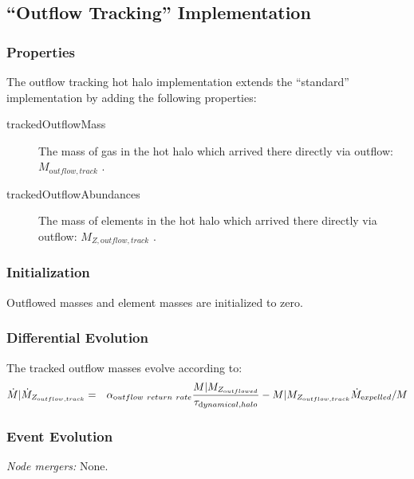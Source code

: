 \subsection{``Outflow Tracking'' Implementation}

\subsubsection{Properties}

The outflow tracking hot halo implementation extends the ``standard'' implementation by adding the following properties:
\begin{description}
 \item [{\normalfont \ttfamily trackedOutflowMass}] The mass of gas in the hot halo which arrived there directly via outflow: $M_{\mathrm outflow, track}$ {\normalfont \ttfamily [hotHaloTrackedOutflowMass]}.
 \item [{\normalfont \ttfamily trackedOutflowAbundances}] The mass of elements in the hot halo which arrived there directly via outflow: $M_{Z, {\mathrm outflow, track}}$ {\normalfont \ttfamily [hotHaloTrackedOutflowAbundances]}.
\end{description}

\subsubsection{Initialization}

Outflowed masses and element masses are initialized to zero.

\subsubsection{Differential Evolution}

The tracked outflow masses evolve according to:
\begin{eqnarray}
 \dot{M}|\dot{M}_{Z_{\mathrm outflow, track}} &=& \alpha_{\mathrm outflow~return~rate} {M|M_{Z_{\mathrm outflowed}}\over \tau_{\mathrm dynamical, halo}} -  M|M_{Z_{\mathrm outflow, track}} \dot{M}_{\mathrm expelled} / M\\
\end{eqnarray}

\subsubsection{Event Evolution}

\noindent\emph{Node mergers:} None.\\

